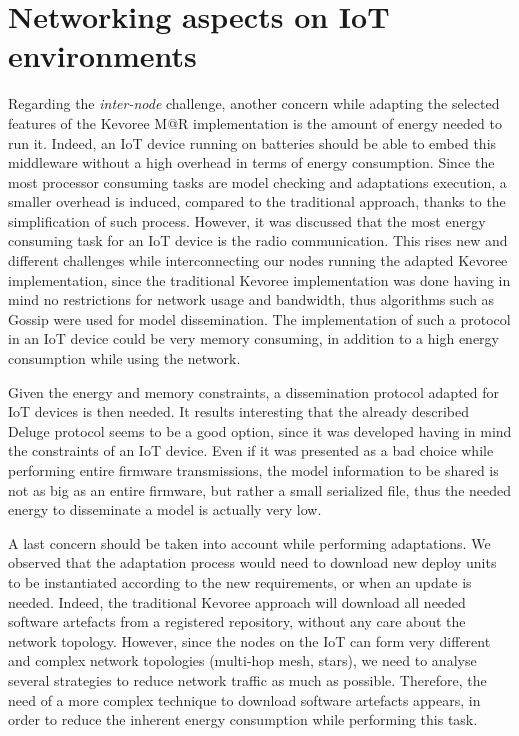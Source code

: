 
\section{Networking aspects on IoT environments}
\label{subsec:ImplConstraints}
Regarding the \textit{inter-node} challenge, another concern while adapting the selected features of the Kevoree M@R implementation is the amount of energy needed to run it.
Indeed, an IoT device running on batteries should be able to embed this middleware without a high overhead in terms of energy consumption.
Since the most processor consuming tasks are model checking and adaptations execution, a smaller overhead is induced, compared to the traditional approach, thanks to the simplification of such process.
However, it was discussed that the most energy consuming task for an IoT device is the radio communication.
This rises new and different challenges while interconnecting our nodes running the adapted Kevoree implementation, since the traditional Kevoree implementation was done having in mind no restrictions for network usage and bandwidth, thus algorithms such as Gossip \cite{fouquet2012dissemination} were used for model dissemination.
The implementation of such a protocol in an IoT device could be very memory consuming, in addition to a high energy consumption while using the network.

Given the energy and memory constraints, a dissemination protocol adapted for IoT devices is then needed.
It results interesting that the already described Deluge protocol \cite{hui2004dynamic} seems to be a good option, since it was developed having in mind the constraints of an IoT device.
Even if it was presented as a bad choice while performing entire firmware transmissions, the model information to be shared is not as big as an entire firmware, but rather a small serialized file, thus the needed energy to disseminate a model is actually very low.

A last concern should be taken into account while performing adaptations.
We observed that the adaptation process would need to download new deploy units to be instantiated according to the new requirements, or when an update is needed.
Indeed, the traditional Kevoree approach will download all needed software artefacts from a registered repository, without any care about the network topology.
However, since the nodes on the IoT can form very different and complex network topologies (multi-hop mesh, stars), we need to analyse several strategies to reduce network traffic as much as possible.
Therefore, the need of a more complex technique to download software artefacts appears, in order to reduce the inherent energy consumption while performing this task.

